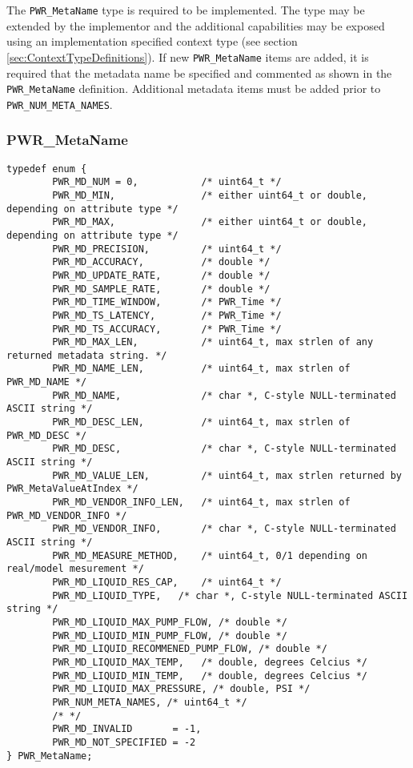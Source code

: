 The \texttt{PWR_MetaName} type is required to be implemented. 
The type may be extended by the implementor and the additional capabilities may be exposed using an implementation specified context type (see section \ref{sec:ContextTypeDefinitions}).
If new \texttt{PWR_MetaName} items are added, it is required that the metadata name be specified and commented as shown in the \texttt{PWR_MetaName} definition. 
Additional metadata items must be added prior to \texttt{PWR_NUM_META_NAMES}.



\subsubsection{PWR_MetaName}\label{type:MetaName}
\begin{center}
\begin{minipage}{.95\linewidth}%
\begin{lstlisting}
typedef enum {
        PWR_MD_NUM = 0,           /* uint64_t */
        PWR_MD_MIN,               /* either uint64_t or double, depending on attribute type */
        PWR_MD_MAX,               /* either uint64_t or double, depending on attribute type */
        PWR_MD_PRECISION,         /* uint64_t */
        PWR_MD_ACCURACY,          /* double */
        PWR_MD_UPDATE_RATE,       /* double */
        PWR_MD_SAMPLE_RATE,       /* double */
        PWR_MD_TIME_WINDOW,       /* PWR_Time */
        PWR_MD_TS_LATENCY,        /* PWR_Time */
        PWR_MD_TS_ACCURACY,       /* PWR_Time */
        PWR_MD_MAX_LEN,           /* uint64_t, max strlen of any returned metadata string. */
        PWR_MD_NAME_LEN,          /* uint64_t, max strlen of PWR_MD_NAME */
        PWR_MD_NAME,              /* char *, C-style NULL-terminated ASCII string */
        PWR_MD_DESC_LEN,          /* uint64_t, max strlen of PWR_MD_DESC */
        PWR_MD_DESC,              /* char *, C-style NULL-terminated ASCII string */
        PWR_MD_VALUE_LEN,         /* uint64_t, max strlen returned by PWR_MetaValueAtIndex */
        PWR_MD_VENDOR_INFO_LEN,   /* uint64_t, max strlen of PWR_MD_VENDOR_INFO */
        PWR_MD_VENDOR_INFO,       /* char *, C-style NULL-terminated ASCII string */
        PWR_MD_MEASURE_METHOD,    /* uint64_t, 0/1 depending on real/model mesurement */
        PWR_MD_LIQUID_RES_CAP,    /* uint64_t */
        PWR_MD_LIQUID_TYPE,	  /* char *, C-style NULL-terminated ASCII string */
        PWR_MD_LIQUID_MAX_PUMP_FLOW, /* double */
        PWR_MD_LIQUID_MIN_PUMP_FLOW, /* double */
        PWR_MD_LIQUID_RECOMMENED_PUMP_FLOW, /* double */
        PWR_MD_LIQUID_MAX_TEMP,   /* double, degrees Celcius */
        PWR_MD_LIQUID_MIN_TEMP,   /* double, degrees Celcius */
        PWR_MD_LIQUID_MAX_PRESSURE, /* double, PSI */
        PWR_NUM_META_NAMES,	/* uint64_t */
        /* */
        PWR_MD_INVALID       = -1,
        PWR_MD_NOT_SPECIFIED = -2
} PWR_MetaName;
\end{lstlisting}
\end{minipage}
\end{center}


